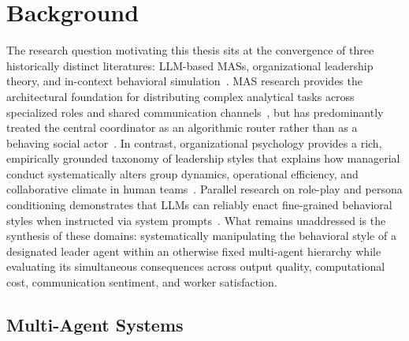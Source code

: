 \chapter{Background}
\label{chap:background}

The research question motivating this thesis sits at the convergence of three historically distinct literatures: \ac{LLM}-based \acp{MAS}, organizational leadership theory, and in-context behavioral simulation~\cite{park2023generativeagentsinteractivesimulacra, muralidharan2025lessonshumanteamsapplied, kwak2026leadershipcoordinationcontrolbehavioral}.
\ac{MAS} research provides the architectural foundation for distributing complex analytical tasks across specialized roles and shared communication channels~\cite{chen2023agentversefacilitatingmultiagentcollaboration, guo2024largelanguagemodelbased}, but has predominantly treated the central coordinator as an algorithmic router rather than as a behaving social actor~\cite{dang2025multiagentcollaborationevolvingorchestration}.
In contrast, organizational psychology provides a rich, empirically grounded taxonomy of leadership styles that explains how managerial conduct systematically alters group dynamics, operational efficiency, and collaborative climate in human teams~\cite{goleman2000leadership, mathieu2017teamwork, barrick1998personalityteamwork}.
Parallel research on role-play and persona conditioning demonstrates that \acp{LLM} can reliably enact fine-grained behavioral styles when instructed via system prompts~\cite{shanahan2023roleplaylargelanguagemodels, salewski2023incontextimpersonationrevealslarge, serapiogarcia2025personalitytraitslargelanguage, jiang2024personallminvestigatingabilitylarge}.
What remains unaddressed is the synthesis of these domains: systematically manipulating the behavioral style of a designated leader agent within an otherwise fixed multi-agent hierarchy while evaluating its simultaneous consequences across output quality, computational cost, communication sentiment, and worker satisfaction.

\section{Multi-Agent Systems}
\label{sec:multi-agent-systems}

